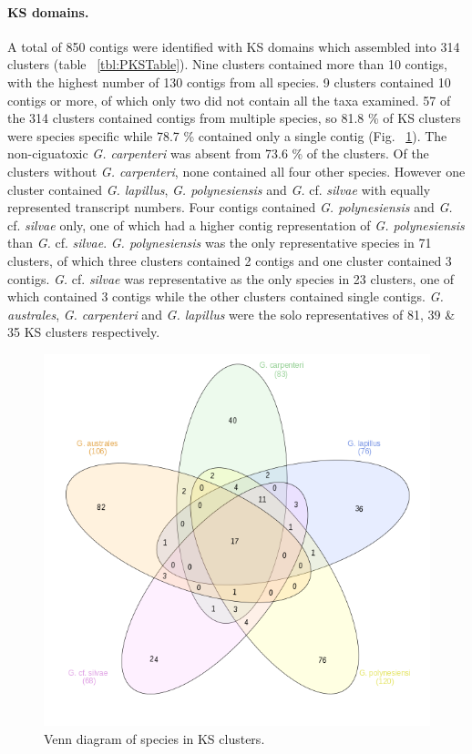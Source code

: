 \documentclass[12pt]{article}
\begin{document}
\paragraph{KS domains.}
\FloatBarrier
A total of 850 contigs were identified with KS domains which assembled into 314 clusters (table ~\ref{tbl:PKSTable}). 
Nine clusters contained more than 10 contigs, with the highest number of 130 contigs from all species.
9 clusters contained 10 contigs or more, of which only two did not contain all the taxa examined.
57 of the 314 clusters contained contigs from multiple species, so 81.8 \% of KS clusters were species specific while 78.7 \% contained only a single contig (Fig. ~\ref{fig:KSVenn}). 
The non-ciguatoxic \textit{G. carpenteri} was absent from 73.6 \% of the clusters. 
Of the clusters without \textit{G. carpenteri}, none contained all four other species. 
However one cluster contained \textit{G. lapillus}, \textit{G. polynesiensis} and \emph{G.} cf. \emph{silvae} with equally represented transcript numbers. 
Four contigs contained \textit{G. polynesiensis} and \emph{G.} cf. \emph{silvae} only, one of which had a higher contig representation of \textit{G. polynesiensis} than \emph{G.} cf. \emph{silvae}. 
\textit{G. polynesiensis} was the only representative species in 71 clusters, of which three clusters contained 2 contigs and one cluster contained 3 contigs. 
\emph{G.} cf. \emph{silvae} was representative as the only species in 23 clusters, one of which contained 3 contigs while the other clusters contained single contigs.
\textit{G. australes}, \textit{G. carpenteri} and \textit{G. lapillus} were the solo representatives of 81, 39 \& 35 KS clusters respectively. \\
\begin{figure} 
\includegraphics[scale=1]{3Aug18_cluster-investigation/pks/KS-venn.png} 
\caption{Venn diagram of species in KS clusters.} 
\label{fig:KSVenn}
\end{figure} 
\FloatBarrier
\end{document}
